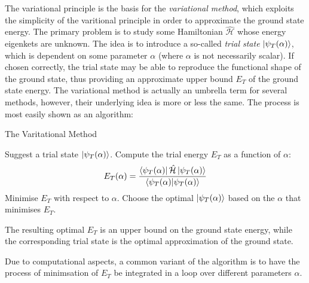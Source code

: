 \documentclass[nofootinbib,reprint,english]{revtex4-1}
\newcommand{\hatHH}{\hat{\mathcal{H}}}
\begin{document}
The variational principle is the basis for the \emph{variational method}, which exploits the simplicity of the varitional principle in order to approximate the ground state energy. The primary problem is to study some Hamiltonian \(\hatHH\) whose energy eigenkets are unknown. The idea is to introduce a so-called \emph{trial state} \(\ket{\psi_T(\alpha)}\), which is dependent on some parameter \(\alpha\) (where \(\alpha\) is not necessarily scalar). If chosen correctly, the trial state may be able to reproduce the functional shape of the ground state, thus providing an approximate upper bound \(E_T\) of the ground state energy. The variational method is actually an umbrella term for several methods, however, their underlying idea is more or less the same. The process is most easily shown as an algorithm:
\begin{algorithm}[H]
\caption{The Varitational Method}\label{algo:varitational_method}
\begin{algorithmic}[1]
\State Suggest a trial state \(\ket{\psi_T(\alpha)}\).
\State Compute the trial energy \(E_T\) as a function of \(\alpha\):
\[E_T(\alpha)=\frac{\bra{\psi_T(\alpha)}\hatHH\ket{\psi_T(\alpha)}}{\braket{\psi_T(\alpha)}}\]
\State Minimise \(E_T\) with respect to \(\alpha\).
\State Choose the optimal \(\ket{\psi_T(\alpha)}\) based on the \(\alpha\) that minimises \(E_T\).

\noindent The resulting optimal \(E_T\) is an upper bound on the ground state energy, while the corresponding trial state is the optimal approximation of the ground state.
\end{algorithmic}
\end{algorithm}
Due to computational aspects, a common variant of the algorithm is to have the process of minimsation of \(E_T\) be integrated in a loop over different parameters \(\alpha\).
\end{document}
